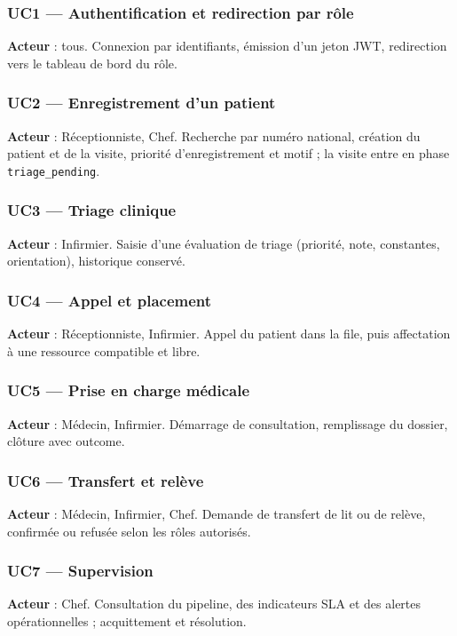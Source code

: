 \subsubsection{UC1 — Authentification et redirection par rôle}
\textbf{Acteur} : tous. Connexion par identifiants, émission d'un jeton JWT, redirection vers le tableau de bord du rôle.

\subsubsection{UC2 — Enregistrement d'un patient}
\textbf{Acteur} : Réceptionniste, Chef. Recherche par numéro national, création du patient et de la visite, priorité d'enregistrement et motif ; la visite entre en phase \texttt{triage\_pending}.

\subsubsection{UC3 — Triage clinique}
\textbf{Acteur} : Infirmier. Saisie d'une évaluation de triage (priorité, note, constantes, orientation), historique conservé.

\subsubsection{UC4 — Appel et placement}
\textbf{Acteur} : Réceptionniste, Infirmier. Appel du patient dans la file, puis affectation à une ressource compatible et libre.

\subsubsection{UC5 — Prise en charge médicale}
\textbf{Acteur} : Médecin, Infirmier. Démarrage de consultation, remplissage du dossier, clôture avec outcome.

\subsubsection{UC6 — Transfert et relève}
\textbf{Acteur} : Médecin, Infirmier, Chef. Demande de transfert de lit ou de relève, confirmée ou refusée selon les rôles autorisés.

\subsubsection{UC7 — Supervision}
\textbf{Acteur} : Chef. Consultation du pipeline, des indicateurs SLA et des alertes opérationnelles ; acquittement et résolution.

